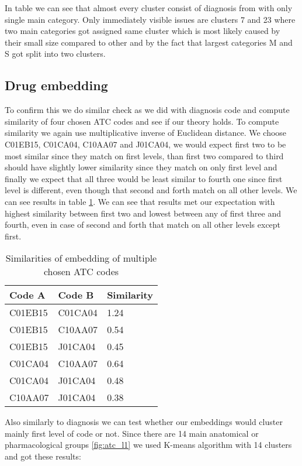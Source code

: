 In table we can see that almost every cluster consist of diagnosis from with only single main category. Only immediately visible issues are clusters 7 and 23 where two main categories got assigned same cluster which is most likely caused by their small size compared to other and by the fact that largest categories M and S got split into two clusters.

\subsection{Drug embedding}

To confirm this we do similar check as we did with diagnosis code and compute similarity of four chosen ATC codes and see if our theory holds. To compute similarity we again use multiplicative inverse of Euclidean distance. We choose C01EB15, C01CA04, C10AA07 and J01CA04, we would expect first two to be most similar since they match on first levels, than first two compared to third should have slightly lower similarity since they match on only first level and finally we expect that all three would be least similar to fourth one since first level is different, even though that second and forth match on all other levels.  We can see results in table \ref{tab:drug_emb_show}. We can see that results met our expectation with highest similarity between first two and lowest between any of first three and fourth, even in case of second and forth that match on all other levels except first.

\begin{table}[!h]
	\centering
	\begin{tabular}{|l|l|l|}
		\hline
		Code A & Code B & Similarity \\ \hline
		C01EB15 & C01CA04 & 1.24      \\ \hline
		C01EB15 & C10AA07 & 0.54       \\ \hline
		C01EB15 & J01CA04 & 0.45       \\ \hline
		C01CA04 & C10AA07 & 0.64       \\ \hline
		C01CA04 & J01CA04 & 0.48       \\ \hline
		C10AA07 & J01CA04 & 0.38       \\ \hline
	\end{tabular}
	\caption{Similarities of embedding of multiple chosen ATC codes}
	\label{tab:drug_emb_show}
\end{table}  

Also similarly to diagnosis we can test whether our embeddings would cluster mainly first level of code or not. Since there are 14 main anatomical or pharmacological groups \ref{fig:atc_l1} we used K-means algorithm with 14 clusters and got these results:


